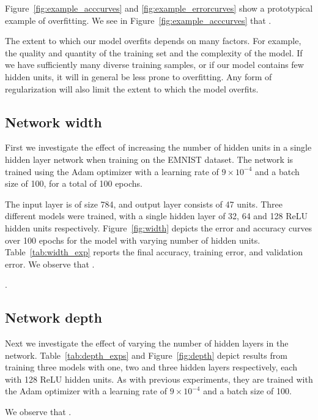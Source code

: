 \documentclass{article}
\begin{document}
Figure~\ref{fig:example_acccurves} and \ref{fig:example_errorcurves} show a prototypical example of overfitting.
We see in Figure~\ref{fig:example_acccurves} that \questionOne.

The extent to which our model overfits depends on many factors.
For example, the quality and quantity of the training set and the complexity of the model. 
If we have sufficiently many diverse training samples, or if our model contains few hidden units, it will in general be less prone to overfitting. 
Any form of regularization will also limit the extent to which the model overfits.


\subsection{Network width}

\questionTableOne
\questionFigureTwo

First we investigate the effect of increasing the number of hidden units in a single hidden layer network when training on the EMNIST dataset.
The network is trained using the Adam optimizer
with a learning rate of $9 \times 10^{-4}$ and a batch size of 100, for a total of 100 epochs.

The input layer is of size 784, and output layer consists of 47 units. 
Three different models were trained, with a single hidden layer of 32, 64 and 128 ReLU hidden units respectively.
Figure~\ref{fig:width} depicts the error and accuracy curves over 100 epochs for the model with varying number of hidden units.
Table~\ref{tab:width_exp} reports the final accuracy, training error, and validation error.
We observe that \questionTwo.

\questionThree.


\subsection{Network depth}

\questionTableTwo
\questionFigureThree

Next we investigate the effect of varying the number of hidden layers in the network. 
Table~\ref{tab:depth_exps} and Figure~\ref{fig:depth} depict results from training three models with one, two and three hidden layers respectively, each with 128 ReLU hidden units. 
As with previous experiments, they are trained with the Adam optimizer with a learning rate of $9 \times 10^{-4}$ and a batch size of 100. 

We observe that \questionFour.
\end{document}
